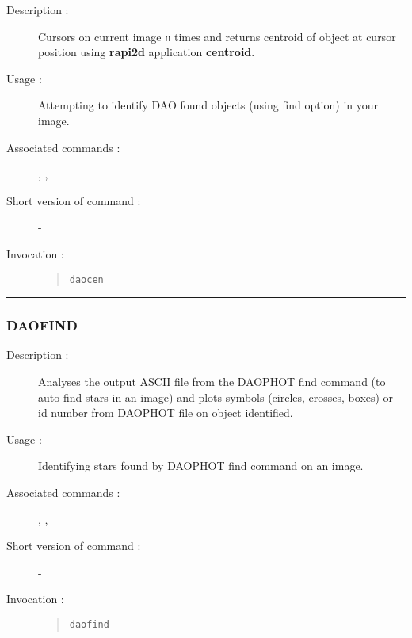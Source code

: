 \begin{description}

\item[Description :] Cursors on current image {\tt n} times and returns
centroid of object at cursor position using {\bf rapi2d} application
{\bf centroid}.

\item[Usage :] Attempting to identify DAO found objects (using find
option) in your image.

\item[Associated commands :] {\tt {}},
{\tt {}}, {\tt {}}

\item[Short version of command :] -

\item[Invocation :]

\begin{quote}{\tt  daocen }\end{quote}

\end{description}

\hrule
\subsubsection*{\label{DAOFIND}DAOFIND}

\begin{description}

\item[Description :] Analyses the output ASCII file from the DAOPHOT
find command (to auto-find stars in an image) and plots symbols
(circles, crosses, boxes) or id number from DAOPHOT file on object
identified.

\item[Usage :] Identifying stars found by DAOPHOT find command on an image.

\item[Associated commands :] {\tt {}},
{\tt {}}, {\tt {}}

\item[Short version of command :] -

\item[Invocation :]

\begin{quote}{\tt  daofind }\end{quote}

\end{description}

